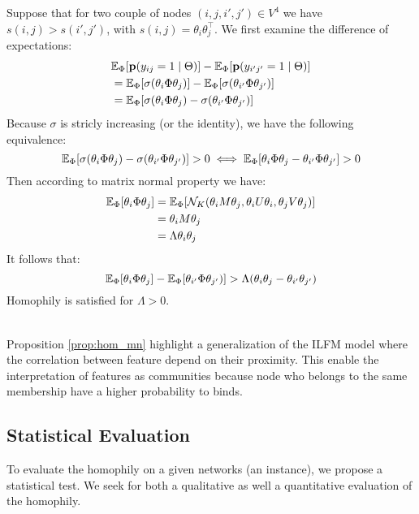 \begin{IEEEproof}
Suppose that for two couple of nodes $(i,j,i',j') \in V^4$ we have $s(i,j) > s(i',j')$, with $s(i,j) =\theta_i \theta_j^\top$. We first examine the difference of expectations:
\begin{align}
&\mathbb{E}_{\Phi}[\mathbf{p}(y_{ij}=1\mid \Theta)] - \mathbb{E}_{\Phi}[\mathbf{p}(y_{i'j'}=1\mid \Theta)] \\
&= \mathbb{E}_{\Phi}[\sigma(\theta_i \Phi \theta_j)] -  \mathbb{E}_{\Phi}[\sigma(\theta_{i'} \Phi \theta_{j'})] \\
&= \mathbb{E}_{\Phi}[\sigma(\theta_i \Phi \theta_j) - \sigma(\theta_{i'} \Phi \theta_{j'})]
\end{align}
Because $\sigma$ is stricly increasing (or the identity), we have the following equivalence:
\begin{equation}
\mathbb{E}_{\Phi}[\sigma(\theta_i \Phi \theta_j) - \sigma(\theta_{i'} \Phi \theta_{j'})] > 0  \iff \mathbb{E}_{\Phi}[\theta_i \Phi \theta_j - \theta_{i'} \Phi \theta_{j'}] > 0 
\end{equation}
Then according to matrix normal property we have:
\begin{align}
\mathbb{E}_{\Phi}[\theta_i \Phi \theta_j] &= \mathbb{E}_{\Phi}[\mathcal{N}_K(\theta_iM\theta_j, \theta_iU\theta_i, \theta_jV\theta_j)] \\
&= \theta_iM\theta_j \\
&= \Lambda \theta_i \theta_j
\end{align}
It follows that:  
\begin{equation}
\mathbb{E}_{\Phi}[\theta_i \Phi \theta_j] - \mathbb{E}_{\Phi}[\theta_{i'} \Phi \theta_{j'})] > \Lambda (\theta_i \theta_j - \theta_{i'} \theta_{j'} )
\end{equation}
Homophily is satisfied for $\Lambda > 0$.
\end{IEEEproof}~\\

Proposition \ref{prop:hom_mn} highlight a generalization of the ILFM model where the correlation between feature depend on their proximity. This enable the interpretation of features as communities because node who belongs to the same membership have a higher probability to binds.


\subsection{Statistical Evaluation}
To evaluate the homophily on a given networks (an instance), we propose a statistical test. We seek for both a qualitative as well a quantitative evaluation of the homophily.

